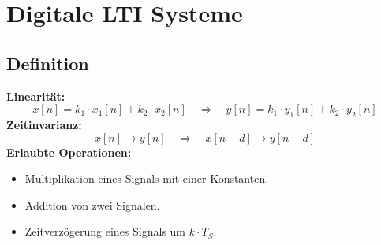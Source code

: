 


\chapter{Digitale LTI Systeme}

\section{Definition}
\textbf{Linearität:}
\[ x[n] = k_1 \cdot x_1[n] + k_2 \cdot x_2[n] \quad \Longrightarrow \quad y[n] = k_1 \cdot y_1[n] + k_2 \cdot y_2[n] \]
\textbf{Zeitinvarianz:}
\[ x[n] \rightarrow y[n] \quad \Longrightarrow \quad x[n-d] \rightarrow y[n-d] \]
\textbf{Erlaubte Operationen:}
\begin{itemize}[noitemsep,topsep=3pt]
	\item Multiplikation eines Signals mit einer Konstanten.
	\item Addition von zwei Signalen.
	\item Zeitverzögerung eines Signals um $k \cdot T_S$.
\end{itemize}

